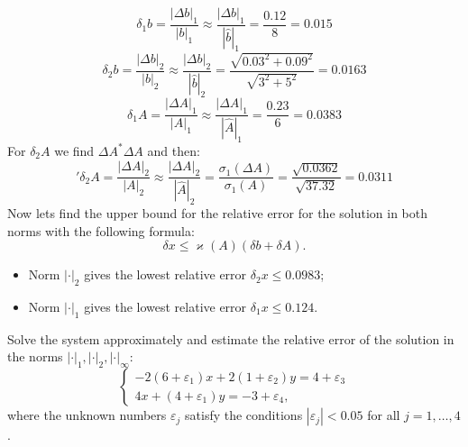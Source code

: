 \documentclass[12pt]{report}
\begin{document}
\begin{solution}
  \[\delta_1 b =\dfrac{|\Delta b|_1}{|b|_1}\approx \dfrac{|\Delta b|_1}{|\hat{b}|_1} = \dfrac{0.12}{8}= 0.015\]
\[\delta_2 b =\dfrac{|\Delta b|_2}{|b|_2}\approx \dfrac{|\Delta b|_2}{|\hat{b}|_2} = \dfrac{\sqrt{0.03^2+0.09^2}}{\sqrt{3^2+5^2}}= 0.0163\]
\[\delta_1 A =\dfrac{|\Delta A|_1}{|A|_1}\approx \dfrac{|\Delta A|_1}{|\hat{A}|_1} = \dfrac{0.23}{6} = 0.0383\]
For $\delta_2 A$ we find $\Delta A^* \Delta A$ and then:  
\['
\delta_2 A =\dfrac{|\Delta A|_2}{|A|_2}\approx \dfrac{|\Delta A|_2}{|\hat{A}|_2} =\dfrac{\sigma_1 (\Delta A)}{\sigma_1 (A)} = \dfrac{\sqrt{0.0362}}{\sqrt{37.32}}= 0.0311
\]
Now lets find the upper bound for the relative error for the solution in both norms with the following formula:
\[
       \delta x \leq \varkappa (A) \left(\delta b + \delta A\right).
\]
\begin{itemize}
   \item Norm $|\cdot|_2$ gives the lowest relative error $\delta_2 x \leq 0.0983$;
   \item Norm $|\cdot|_1$ gives the lowest relative error $\delta_1 x \leq 0.124$.
\end{itemize}

\end{solution}

\begin{problem}{}
   Solve the system approximately and estimate the relative error of the solution in the norms $|\cdot|_1, |\cdot|_2, |\cdot|_\infty$:
   \[
      \left\{
         \begin{array}{c}
            -2(6 + \varepsilon_1) x + 2(1 + \varepsilon_2) y = 4 + \varepsilon_3\\
            4 x + (4 + \varepsilon_1)y = -3 + \varepsilon_4,
         \end{array}
      \right.
   \]
   where the unknown numbers $\varepsilon_j$ satisfy the conditions $|\varepsilon_j| < 0.05$ for all $j = 1, \ldots, 4$.
\end{problem}
\end{document}
